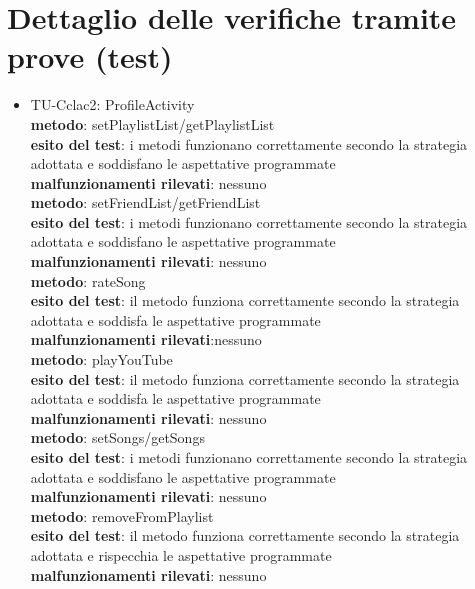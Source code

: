\section{Dettaglio delle verifiche tramite prove (test)}
\begin{itemize}
    
  \item TU-Cclac2: ProfileActivity\\
  \textbf{metodo}: setPlaylistList/getPlaylistList\\
  \textbf{esito del test}: i metodi funzionano correttamente secondo la
  strategia adottata e soddisfano le aspettative programmate\\
  \textbf{malfunzionamenti rilevati}: nessuno\\
  
  \textbf{metodo}: setFriendList/getFriendList\\
  \textbf{esito del test}: i metodi funzionano correttamente secondo la
  strategia adottata e soddisfano le aspettative programmate\\
  \textbf{malfunzionamenti rilevati}: nessuno\\
  
  \textbf{metodo}: rateSong\\
  \textbf{esito del test}: il metodo funziona correttamente secondo la strategia
  adottata e soddisfa le aspettative programmate\\ 
  \textbf{malfunzionamenti
  rilevati}:nessuno\\
  
  \textbf{metodo}: playYouTube\\
  \textbf{esito del test}: il metodo funziona correttamente secondo la strategia
  adottata e soddisfa le aspettative programmate\\
  \textbf{malfunzionamenti rilevati}: nessuno\\
  
  \textbf{metodo}: setSongs/getSongs\\
  \textbf{esito del test}: i metodi funzionano correttamente secondo la
  strategia adottata e soddisfano le aspettative programmate\\
  \textbf{malfunzionamenti rilevati}: nessuno\\
  
  \textbf{metodo}: removeFromPlaylist\\
  \textbf{esito del test}: il metodo funziona correttamente secondo la strategia
  adottata e rispecchia le aspettative programmate\\
  \textbf{malfunzionamenti rilevati}: nessuno\\
  

\end{itemize}

